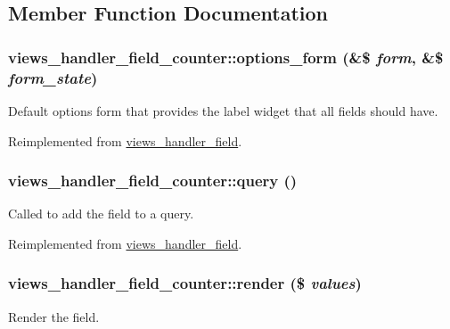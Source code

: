 \subsection{Member Function Documentation}
\hypertarget{classviews__handler__field__counter_af2b34cb062b976874ba84d690293bafc}{
\subsubsection[{options\_\-form}]{\setlength{\rightskip}{0pt plus 5cm}views\_\-handler\_\-field\_\-counter::options\_\-form (\&\$ {\em form}, \/  \&\$ {\em form\_\-state})}}
\label{classviews__handler__field__counter_af2b34cb062b976874ba84d690293bafc}
Default options form that provides the label widget that all fields should have. 

Reimplemented from \hyperlink{classviews__handler__field_a0435d161922b7b4b84f02a2e79bb947a}{views\_\-handler\_\-field}.\hypertarget{classviews__handler__field__counter_a32bdc9416672906d950f7ba73cc5bbaa}{
\subsubsection[{query}]{\setlength{\rightskip}{0pt plus 5cm}views\_\-handler\_\-field\_\-counter::query ()}}
\label{classviews__handler__field__counter_a32bdc9416672906d950f7ba73cc5bbaa}
Called to add the field to a query. 

Reimplemented from \hyperlink{classviews__handler__field_a4f661f91bcbe80d4a00c30a31456c502}{views\_\-handler\_\-field}.\hypertarget{classviews__handler__field__counter_af046da8114cbb0ddcc888a305a1676e2}{
\subsubsection[{render}]{\setlength{\rightskip}{0pt plus 5cm}views\_\-handler\_\-field\_\-counter::render (\$ {\em values})}}
\label{classviews__handler__field__counter_af046da8114cbb0ddcc888a305a1676e2}
Render the field.


